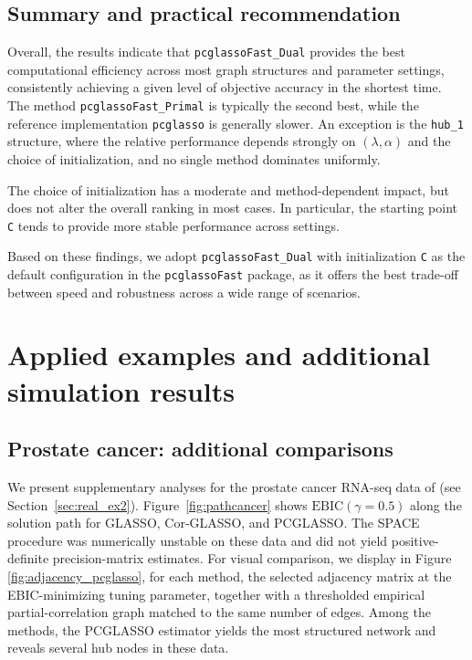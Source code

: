\documentclass[12pt]{amsart}
\numberwithin{equation}{section}
\numberwithin{equation}{section}
\theoremstyle{plain}
\theoremstyle{definition}
\begin{document}
\subsection{Summary and practical recommendation}
Overall, the results indicate that \texttt{pcglassoFast\_Dual} provides the best computational efficiency across most graph structures and parameter settings, consistently achieving a given level of objective accuracy in the shortest time.
The method \texttt{pcglassoFast\_Primal} is typically the second best, while the reference implementation \texttt{pcglasso} is generally slower.
An exception is the \texttt{hub\_1} structure, where the relative performance depends strongly on $(\lambda,\alpha)$ and the choice of initialization, and no single method dominates uniformly.

The choice of initialization has a moderate and method-dependent impact, but does not alter the overall ranking in most cases.
In particular, the starting point \texttt{C} tends to provide more stable performance across settings.

Based on these findings, we adopt \texttt{pcglassoFast\_Dual} with initialization \texttt{C} as the default configuration in the \texttt{pcglassoFast} package, as it offers the best trade-off between speed and robustness across a wide range of scenarios.






\section{Applied examples and additional simulation results}\label{sec:appendix_applied}

\subsection{Prostate cancer: additional comparisons}\label{sec:prostateCont}
We present supplementary analyses for the prostate cancer RNA-seq data of \citet{HUB25} (see Section~\ref{sec:real_ex2}). Figure~\ref{fig:pathcancer} shows $\mathrm{EBIC}(\gamma=0.5)$ along the solution path for GLASSO, Cor-GLASSO, and PCGLASSO. The SPACE procedure was numerically unstable on these data and did not yield positive-definite precision-matrix estimates. For visual comparison, we display in Figure \ref{fig:adjacency_pcglasso}, for each method, the selected adjacency matrix at the EBIC-minimizing tuning parameter, together with a thresholded empirical partial-correlation graph matched to the same number of edges. Among the methods, the PCGLASSO estimator yields the most structured network and reveals several hub nodes in these data.
\end{document}
